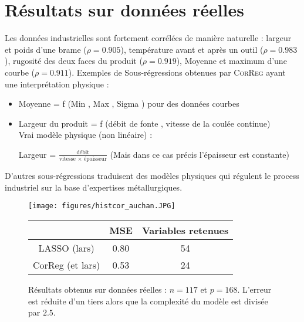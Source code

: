 \documentclass[12pt]{article}
\begin{document}
\section{Résultats sur données réelles}
Les données industrielles sont fortement corrélées de manière naturelle : largeur et poids d'une brame ($\rho=0.905$), température avant et après un outil ($\rho=0.983$), rugosité des deux faces du produit ($\rho=0.919$), Moyenne et maximum d'une courbe ($\rho=0.911$).
Exemples de Sous-régressions obtenues par \textsc{CorReg} ayant une interprétation physique :
\begin{itemize}
	\item Moyenne = f (Min , Max , Sigma ) pour des données courbes
	\item Largeur du produit = f (débit de fonte , vitesse de la coulée continue)	\\
Vrai modèle physique (non linéaire) :

	 Largeur = $\frac{\textrm{débit}}{\textrm{vitesse } \times \textrm{ épaisseur}}$ (Mais dans ce cas précis l'épaisseur est constante)
			\end{itemize}
			
			D'autres sous-régressions traduisent des modèles physiques qui régulent le process industriel sur la base d'expertises métallurgiques.
\\

\begin{figure}[!h]
	\begin{minipage}[c]{.40\linewidth}
			\texttt{[image: figures/histcor\_auchan.JPG]} 
	\end{minipage} \hfill
   \begin{minipage}[c]{.52\linewidth}
		\begin{tabular}{|c|c|c|}
		\hline 
		  & MSE  & Variables retenues  \\ 
		\hline
		LASSO (lars) & 0.80 & 54 \\ 
		\hline 
		CorReg (et lars) & 0.53 & 24  \\ 
		\hline 
		\end{tabular} 
   \end{minipage}
   \caption{Résultats obtenus sur données réelles : $n=117$ et $p=168$. L'erreur est réduite d'un tiers alors que la complexité du modèle est divisée par $2.5$.   }
\end{figure}   
	
\end{document}
